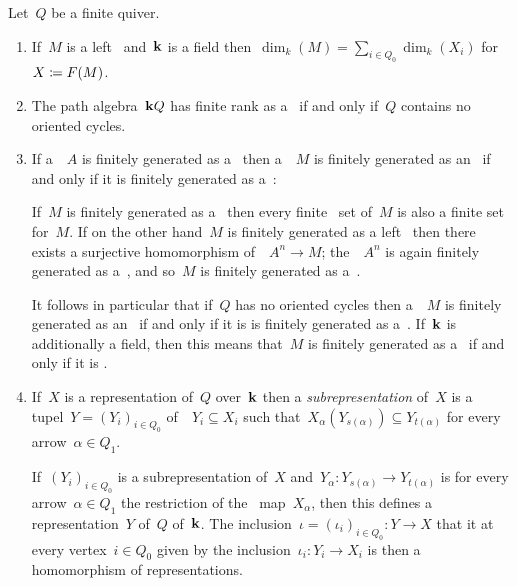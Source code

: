 \begin{remark}
  Let~$Q$ be a finite quiver.
  \begin{enumerate}
    \item
      If~$M$ is a left~{} and~{$\kf$} is a field then~$\dim_k(M) = \sum_{i \in Q_0} \dim_k(X_i)$ for~$X \coloneqq F(M)$.
    \item
      The path algebra~$\mathbf{k} Q$ has finite rank as a~{\module{$\kf$}} if and only if~$Q$ contains no oriented cycles.
    \item
      If a~{\kalg}~$A$ is finitely generated as a~{\module{$\kf$}} then a~{}~$M$ is finitely generated as an~{} if and only if it is finitely generated as a~{\module{$\kf$}}:

      If~$M$ is finitely generated as a~{\module{$\kf$}} then every finite~ set of~$M$ is also a finite  set for~$M$.
      If on the other hand~$M$ is finitely generated as a left~{} then there exists a surjective homomorphism of~{}~$A^n \to M$;
      the~{}~$A^n$ is again finitely generated as a~{\module{$\kf$}}, and so~$M$ is finitely generated as a~{\module{$\kf$}}.
      
      It follows in particular that if~$Q$ has no oriented cycles then a~{}~$M$ is finitely generated as an~{} if and only if it is is finitely generated as a~{\module{$\kf$}}.
      If~$\kf$ is additionally a field, then this means that~$M$ is finitely generated as a~{} if and only if it is {\fd}.
    \item
      If~$X$ is a representation of~$Q$ over~$\kf$ then a \emph{subrepresentation} of~$X$ is a tupel~$Y = (Y_i)_{i \in Q_0}$ of~{\submodules{$\kf$}}~$Y_i \subseteq X_i$ such that~$X_\alpha( Y_{s(\alpha)} ) \subseteq Y_{t(\alpha)}$ for every arrow~$\alpha \in Q_1$.
      
      If~$(Y_i)_{i \in Q_0}$ is a subrepresentation of~$X$ and~$Y_\alpha \colon Y_{s(\alpha)} \to Y_{t(\alpha)}$ is for every arrow~$\alpha \in Q_1$ the restriction of the~{\klin} map~$X_\alpha$, then this defines a representation~$Y$ of~$Q$ of~$\kf$.
      The inclusion~$\iota = (\iota_i)_{i \in Q_0} \colon Y \to X$ that it at every vertex~$i \in Q_0$ given by the inclusion~$\iota_i \colon Y_i \to X_i$ is then a homomorphism of representations.
      

\end{enumerate}
\end{remark}
